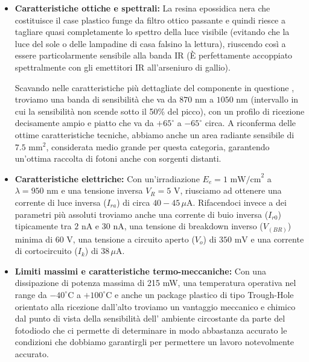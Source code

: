 \documentclass[12pt,a4paper]{article}
\begin{document}
        \begin{itemize}
            \item \textbf{Caratteristiche ottiche e spettrali:} La resina epossidica nera che costituisce il case plastico funge da filtro ottico passante e quindi riesce a
                tagliare quasi completamente lo spettro della luce visibile (evitando che la luce del sole o delle lampadine di casa
                falsino la lettura), riuscendo così a essere particolarmente sensibile alla banda IR (È perfettamente accoppiato
                spettralmente con gli emettitori IR all'arseniuro di gallio).

                Scavando nelle caratteristiche più dettagliate del componente in questione , troviamo una banda di sensibilità che
                va da $870\text{ nm}$ a $1050\text{ nm}$ (intervallo in cui la sensibilità non scende sotto il 50\% del picco), con
                un profilo di ricezione decisamente ampio e piatto che va da $+65^\circ$ a $-65^\circ$ circa. A riconferma delle
                ottime caratteristiche tecniche, abbiamo anche un area radiante sensibile di $7.5\text{ mm}^2$, considerata medio
                grande per questa categoria, garantendo un'ottima raccolta di fotoni anche con sorgenti distanti.
            \item \textbf{Caratteristiche elettriche:} Con un'irradiazione $E_e = 1\text{ mW/cm}^2$ a $\lambda = 950\text{ nm}$ e una tensione inversa $V_R = 5\text{ V}$,
                riusciamo ad ottenere una corrente di luce inversa ($I_{ra}$) di circa $40 - 45\,\mu\text{A}$. Rifacendoci invece a
                dei parametri più assoluti troviamo anche una corrente di buio inversa ($I_{r0}$) tipicamente tra $2\text{ nA}$ e
                $30\text{ nA}$, una tensione di breakdown inverso ($V_{(BR)}$) minima di $60\text{ V}$, una tensione a circuito
                aperto ($V_o$) di $350\text{ mV}$ e una corrente di cortocircuito ($I_k$) di $38\,\mu\text{A}$.
            \item \textbf{Limiti massimi e caratteristiche termo-meccaniche:} Con una dissipazione di potenza massima di 215 mW, una
                temperatura operativa nel range da $-40^\circ\text{C}$ a $+100^\circ\text{C}$ e anche un package plastico di tipo Trough-Hole
                orientato alla ricezione dall'alto troviamo un vantaggio meccanico e chimico dal punto di vista della sensibilità dell'
                ambiente circostante da parte del fotodiodo che ci permette di determinare in modo abbastanza accurato le condizioni
                che dobbiamo garantirgli per permettere un lavoro notevolmente accurato.
        \end{itemize}
\end{document}

